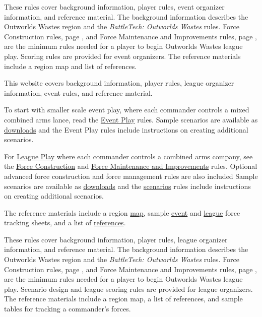  {
These rules cover background information, player rules, event organizer information, and reference material.
The background information describes the Outworlds Wastes region and the \emph{BattleTech: Outworlds Wastes} rules.
Force Construction rules, page \pageref{subsec:event_force_construction}, and Force Maintenance and Improvements rules, page \pageref{subsec:event_force_maintenance}, are the minimum rules needed for a player to begin Outworlds Wastes league play.
Scoring rules are provided for event organizers.
The reference materials include a region map and list of references.
} {
 {
This website covers background information, player rules, league organizer information, event rules, and reference material.

To start with smaller scale event play, where each commander controls a mixed combined arms lance, read the \hyperref[sec:event_play]{Event Play} rules.
Sample scenarios are available as \hyperref[sec:downloads]{downloads} and the Event Play rules include instructions on creating additional scenarios.

For \hyperref[sec:league_play]{League Play} where each commander controls a combined arms company, see the \hyperref[subsec:force_construction]{Force Construction} and \hyperref[subsec:force_maintenance]{Force Maintenance and Improvements} rules.
Optional advanced force construction and force management rules are also included
Sample scenarios are available as \hyperref[sec:downloads]{downloads} and the \hyperref[sec:scenarios]{scenarios} rules include instructions on creating additional scenarios.

The reference materials include a region \hyperref[sec:outworlds_wastes_map]{map}, sample \hyperref[sec:sample_tracking_event]{event} and \hyperref[sec:sample_tracking]{league} force tracking sheets, and a list of \hyperref[sec:references]{references}.
} {
These rules cover background information, player rules, league organizer information, and reference material.
The background information describes the Outworlds Wastes region and the \emph{BattleTech: Outworlds Wastes} rules.
Force Construction rules, page \pageref{subsec:force_construction}, and Force Maintenance and Improvements rules, page \pageref{subsec:force_maintenance}, are the minimum rules needed for a player to begin Outworlds Wastes league play.
Scenario design and league scoring rules are provided for league organizers.
The reference materials include a region map, a list of references, and sample tables for tracking a commander's forces.
}}
